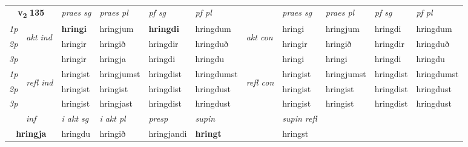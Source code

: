 \noindent
\begin{tabular}{lllllllllll} \toprule
\multicolumn{2}{c}{\textbf{v{\textsubscript{2}}} \Large{\textbf{135}}}  &  \textit{praes sg}  & \textit{praes pl}  &\textit{ pf sg} & \textit{pf pl} &  &  \textit{praes sg}  & \textit{praes pl}  & \textit{pf sg} & \textit{pf pl } \\*
	\cmidrule{3-6} \cmidrule{8-11}
 {\textit{1p}} & \multirow{3}{*}{\begin{turn}{90}\textit{akt ind}\end{turn}} & \textbf{hringi} & hringjum & \textbf{hringdi} & hringdum & \multirow{3}{*}{\begin{turn}{90}\textit{akt con}\end{turn}} &hringi & hringjum & hringdi & hringdum\\*
 {\textit{2p}} &  &  hringir  & hringið & hringdir & hringduð & & hringir & hringið & hringdir & hringduð \\*
{\textit{3p}} &  & hringir & hringja & hringdi & hringdu & & hringi & hringi& hringdi & hringdu \\*
\cmidrule{3-6} \cmidrule{8-11}
 {\textit{1p}} & \multirow{3}{*}{\begin{turn}{90}\textit{refl ind}\end{turn}}  & hringist & hringjumst & hringdist & hringdumst & \multirow{3}{*}{\begin{turn}{90}\textit{refl con}\end{turn}}  &hringist & hringjumst & hringdist & hringdumst \\*
 {\textit{2p}} &  & hringist & hringist & hringdist & hringdust & &hringist & hringist & hringdist & hringdust \\*
 {\textit{3p}}  & & hringist & hringjast & hringdist & hringdust & & hringist & hringist& hringdist & hringdust \\*
\cmidrule{3-6} \cmidrule{8-11}

   \multicolumn{2}{c}{\textit{inf}}  & \textit{i akt sg} & \textit{i akt pl}   & \textit{presp} & \textit{supin} && \textit{supin refl}  \\*
  \multicolumn{2}{c}{\textbf{hringja}} & hringdu  & hringið   & hringjandi &  \textbf{hringt} && hringst  \\*
\end{tabular}

